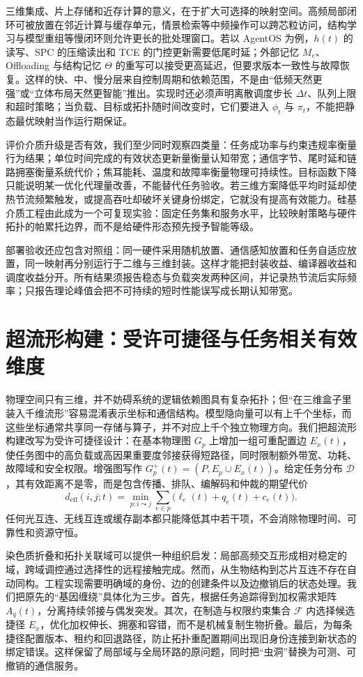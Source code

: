三维集成、片上存储和近存计算的意义，在于扩大可选择的映射空间。高频局部闭环可被放置在邻近计算与缓存单元，情景检索等中频操作可以跨芯粒访问，结构学习与模型重组等慢闭环则允许更长的批处理窗口。若以 AgentOS 为例，$h(t)$ 的读写、SPC 的压缩读出和 TCE 的门控更新需要低尾时延；外部记忆 $M_e$、Offloading 与结构记忆 $\Theta$ 的重写可以接受更高延迟，但要求版本一致性与故障恢复。这样的快、中、慢分层来自控制周期和依赖范围，不是由“低频天然更强”或“立体布局天然更智能”推出。实现时还必须声明离散调度步长 $\Delta t$、队列上限和超时策略；当负载、目标或拓扑随时间改变时，它们要进入 $\phi_t$ 与 $\pi_t$，不能把静态最优映射当作运行期保证。

评价介质升级是否有效，我们至少同时观察四类量：任务成功率与约束违规率衡量行为结果；单位时间完成的有效状态更新量衡量认知带宽；通信字节、尾时延和链路拥塞衡量系统代价；焦耳能耗、温度和故障率衡量物理可持续性。目标函数下降只能说明某一优化代理量改善，不能替代任务验收。若三维方案降低平均时延却使热节流频繁触发，或提高吞吐却破坏关键身份绑定，它就没有提高有效能力。硅基介质工程由此成为一个可复现实验：固定任务集和服务水平，比较映射策略与硬件拓扑的帕累托边界，而不是给硬件形态预先授予智能等级。

部署验收还应包含对照组：同一硬件采用随机放置、通信感知放置和任务自适应放置，同一映射再分别运行于二维与三维封装。这样才能把封装收益、编译器收益和调度收益分开。所有结果须报告稳态与负载突发两种区间，并记录热节流后实际频率；只报告理论峰值会把不可持续的短时性能误写成长期认知带宽。

\section{超流形构建：受许可捷径与任务相关有效维度}
\label{sec:section_7159}

物理空间只有三维，并不妨碍系统的逻辑依赖图具有复杂拓扑；但“在三维盒子里装入千维流形”容易混淆表示坐标和通信结构。模型隐向量可以有上千个坐标，而这些坐标通常共享同一存储与算子，并不对应上千个独立物理方向。我们把超流形构建改写为受许可捷径设计：在基本物理图 $G_p$ 上增加一组可重配置边 $E_x(t)$，使任务图中的高负载或高因果重要度邻接获得短路径，同时限制额外带宽、功耗、故障域和安全权限。增强图写作 $G_p^+(t)=(P,E_p\cup E_x(t))$。给定任务分布 $\mathcal D$，其有效距离不是零，而是包含传播、排队、编解码和仲裁的期望代价
\[
d_{\mathrm{eff}}(i,j;t)=
\min_{p:i\leadsto j}\sum_{e\in p}
\bigl(\ell_e(t)+q_e(t)+c_e(t)\bigr).
\]
任何光互连、无线互连或缓存副本都只能降低其中若干项，不会消除物理时间、可靠性和资源守恒。

染色质折叠和拓扑关联域可以提供一种组织启发：局部高频交互形成相对稳定的域，跨域调控通过选择性的远程接触完成。然而，从生物结构到芯片互连不存在自动同构。工程实现需要明确域的身份、边的创建条件以及边撤销后的状态处理。我们把原先的“基因缠绕”具体化为三步。首先，根据任务追踪得到加权需求矩阵 $A_q(t)$，分离持续邻接与偶发突发。其次，在制造与权限约束集合 $\mathcal F$ 内选择候选捷径 $E_x$，优化加权伸长、拥塞和容错，而不是机械复制生物折叠。最后，为每条捷径配置版本、租约和回退路径，防止拓扑重配置期间出现旧身份连接到新状态的绑定错误。这样保留了局部域与全局环路的原问题，同时把“虫洞”替换为可测、可撤销的通信服务。

